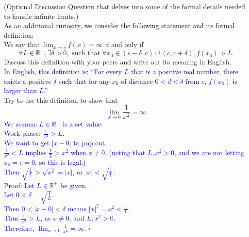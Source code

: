 \documentclass{ximera}
\begin{document}
\begin{exercise}
    (Optional Discussion Question that delves into some of the formal details needed to handle infinite limits.)\\
    As an additional curiosity, we consider the following statement and its formal definition:\\
    We say that $\lim_{x\rightarrow c}f(x)=\infty$ if and only if
    \[\forall L\in \mathbb{R}^+, \exists \delta>0, \text{ such that }\forall x_0\in(c-\delta,c)\cup(c,c+\delta), f(x_0)>L.\]
    Discuss this definition with your peers and write out its meaning in English.\\
    \textcolor{blue}{In English, this definition is: ``For every $L$ that is a positive real number, there exists a positive $\delta$ such that for any $x_0$ of distance $0<d<\delta$ from $c$, $f(x_0)$ is larger than $L$.''}\\
    Try to use this definition to show that 
    \[\lim_{x\rightarrow 0}\frac{1}{x^2}=\infty\]
    \textcolor{blue}{We assume $L\in\mathbb{R}^{+}$ is a set value.\\
    Work phase: $\frac{1}{x^2}>L$.\\
    We want to get $|x-0|$ to pop out.\\
    $\frac{1}{x^2}<L$ implies $\frac{1}{L}>x^2$ when $x\neq0$. (noting that $L,x^2>0$, and we are not letting $x_0=c=0$, so this is legal.)\\
    Then $\sqrt{\frac{1}{L}}>\sqrt{x^2}=|x|$, or $|x|<\sqrt{\frac{1}{L}}$.\\
    Proof: Let $L\in\mathbb{R}^{+}$ be given.\\
    Let $0<\delta=\sqrt{\frac{1}{L}}$.\\
    Then $0<|x-0|<\delta$ means $|x|^2=x^2<\frac{1}{L}$.\\
    Thus $\frac{1}{x^2}>L$, as $x\neq 0$, and $L,x^2>0$.\\
    Therefore, $\lim_{x\rightarrow 0}\frac{1}{x^2}=\infty$. $\square$}
\end{exercise}
\end{document}
